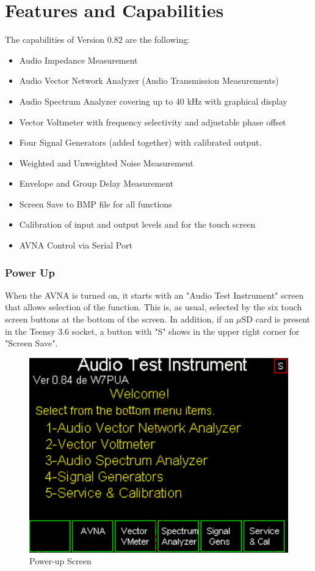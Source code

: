 \part{Features and Capabilities}
The capabilities of Version 0.82 are the following:
\begin{itemize}
\item Audio Impedance Measurement
\item Audio Vector Network Analyzer (Audio Transmission Measurements)
\item Audio Spectrum Analyzer covering up to 40 kHz with graphical display
\item Vector Voltmeter with frequency selectivity and adjustable phase offset
\item Four Signal Generators (added together)  with calibrated output.
\item Weighted and Unweighted Noise Measurement
\item Envelope and Group Delay Measurement
\item Screen Save to BMP file for all functions
\item Calibration of input and output levels and for the touch screen
\item AVNA Control via Serial Port
\end{itemize}

\section{Power Up}When the AVNA is turned on, it starts with an "Audio Test Instrument" screen that allows selection of the function.  This is, as usual, selected by the six touch screen buttons at the bottom of the screen.  In addition, if an $\mu$SD card is present in the Teensy 3.6 socket, a button with "S"  shows in the upper right corner for "Screen Save".

\begin{figure}[H]
\begin{center}
\includegraphics[scale=0.75]{./images/AVNA_000.pdf}
\caption{Power-up Screen}
\label{power-up-label}
\end{center}
\end{figure}

